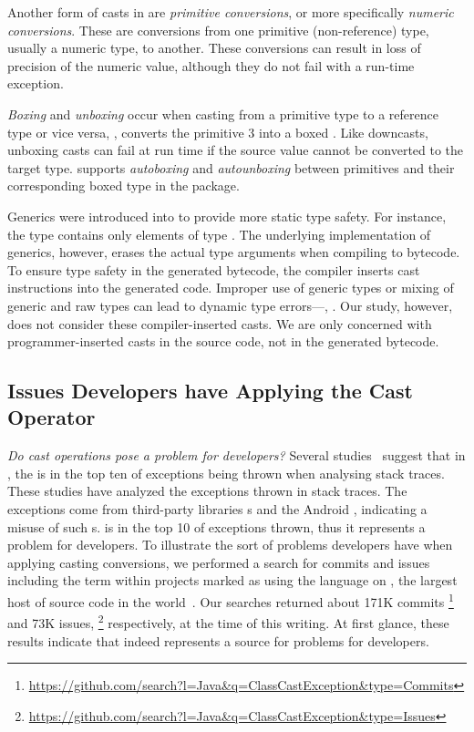 Another form of casts in \java{} are \emph{primitive conversions}, or more specifically
\emph{numeric conversions}. These are conversions from
one primitive (non-reference) type, usually a numeric type, to another. These conversions can result
in loss of precision of the numeric value, although they do not fail with a
run-time exception.

\emph{Boxing} and \emph{unboxing} occur when casting from a primitive type to
a reference type or vice versa, \eg,  converts the primitive
 3 into a boxed .
Like downcasts, unboxing casts can fail at
run time if the source value cannot be converted to the target type.
\java{} supports \emph{autoboxing} and \emph{autounboxing} between primitives and their corresponding
boxed type in the  package.

Generics were introduced into \java{} to provide more static type safety.
For instance, the type  contains only elements of type .
The underlying implementation of generics, however, erases the actual type
arguments when compiling to bytecode. To ensure type safety in the generated
bytecode, the compiler inserts cast instructions into the generated code.
Improper use of generic types or mixing of generic and raw types can lead
to dynamic type errors---\ie, .
Our study, however, does not consider these compiler-inserted casts. We are only concerned with
programmer-inserted casts in the source code, not in the generated bytecode.

\subsection*{Issues Developers have Applying the Cast Operator}

\emph{Do cast operations pose a problem for developers?}
Several studies~\citep{kechagiaUndocumentedUncheckedExceptions2014,coelhoUnveilingExceptionHandling2015,zhitnitskyTop10Exception2016}
suggest that in \java{},
the  is in the top ten of exceptions being thrown when analysing stack traces.
These studies have analyzed the exceptions thrown in stack traces.
The exceptions come from third-party libraries \api{}s and the Android \api{},
indicating a misuse of such \api{}s.
 is in the top 10 of exceptions thrown,
thus it represents a problem for developers.
To illustrate the sort of problems developers have when applying casting conversions,
we performed a search for commits and issues including the term
 within projects marked as using the \java{} language
on \github{},
the largest host of source code in the world~\citep{gousiosLeanGHTorrentGitHub2014}.
Our searches returned about 171K commits%
\footnote{\url{https://github.com/search?l=Java&q=ClassCastException&type=Commits}}
and 73K issues,%
\footnote{\url{https://github.com/search?l=Java&q=ClassCastException&type=Issues}}
respectively, at the time of this writing.
At first glance, these results indicate that  indeed
represents a source for problems for developers.

